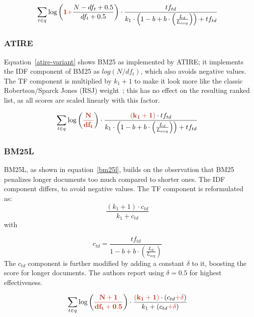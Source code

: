 \begin{equation}
	\label{lucene-accurate}
	\sum_{t\in q}\log\left(\mathbf{\begingroup\color{ruhuisstijlrood}1 +\endgroup} \frac{N-df_t+0.5}{df_t+0.5}\right)\cdot\frac{tf_{td}}{k_1\cdot \left(1-b+b\cdot\left(\frac{L_d}{L_{avg}}\right)\right)+tf_{td}}
\end{equation}

\subsubsection{ATIRE~\cite{ATIRE}}
Equation~\ref{atire-variant} shows BM25 as implemented by ATIRE; it implements the IDF component of BM25 as $log(N/df_{t})$, which also avoids negative values. The TF component is multiplied by $k_1+1$ to make it look more like the classic Robertson/Sparck Jones (RSJ) weight~\cite{RSJ}; this has no effect on the resulting ranked list, as all scores are scaled linearly with this factor.

\begin{equation}
	\label{atire-variant}
	\sum_{t\in q}\log\left(\mathbf{\begingroup\color{ruhuisstijlrood}\frac{N}{df_t}\endgroup}\right)\cdot\frac{\mathbf{\begingroup\color{ruhuisstijlrood}\left(k_1 + 1\right)\endgroup}\cdot tf_{td}}{k_1\cdot\left(1-b+b\cdot\left(\frac{L_{d}}{L_{avg}}\right)\right)+tf_{td}}
\end{equation}

\subsubsection{BM25L~\cite{bm25l}}
BM25L, as shown in equation~\ref{bm25l}, builds on the observation that BM25 penalizes longer documents too much compared to shorter ones. The IDF component differs, to avoid negative values. The TF component is reformulated as:
\begin{equation}
	\frac{\left(k_1+1\right)\cdot c_{td}}{k_1+c_{td}}  
\end{equation}
with 

\begin{equation}
	c_{td} = \frac{tf_{td}}{1 - b + b \cdot \left(\frac{L_d}{L_{avg}}\right)}  
\end{equation}
The $c_{td}$ component is further modified by adding a constant $\delta$ to it, boosting the score for longer documents. The authors report using $\delta = 0.5$ for highest effectiveness.

\begin{equation}
	\label{bm25l}
	\sum_{t\in q} \log\left(\mathbf{\begingroup\color{ruhuisstijlrood}\frac{N+1}{df_t + 0.5}\endgroup}\right)\cdot\frac{\mathbf{\begingroup\color{ruhuisstijlrood}(k_1 + 1)\endgroup}\cdot(c_{td} \mathbf{\begingroup\color{ruhuisstijlrood}+ \delta\endgroup})}{k_1 + (c_{td} \mathbf{\begingroup\color{ruhuisstijlrood}+ \delta\endgroup})}
\end{equation}

